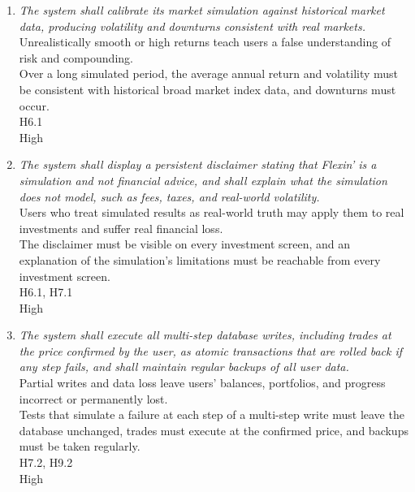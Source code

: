 \documentclass{article}
\begin{document}
\begin{enumerate}[{SR}1:]
\item \hypertarget{sr10}{}\emph{The system shall calibrate its market simulation against historical market data, producing volatility and downturns consistent with real markets.}\\
     Unrealistically smooth or high returns teach users a false understanding of risk and compounding.\\
     Over a long simulated period, the average annual return and volatility must be consistent with historical broad market index data, and downturns must occur.\\
     H6.1\\
     High

\item \hypertarget{sr11}{}\emph{The system shall display a persistent disclaimer stating that Flexin' is a simulation and not financial advice, and shall explain what the simulation does not model, such as fees, taxes, and real-world volatility.}\\
     Users who treat simulated results as real-world truth may apply them to real investments and suffer real financial loss.\\
     The disclaimer must be visible on every investment screen, and an explanation of the simulation's limitations must be reachable from every investment screen.\\
     H6.1, H7.1\\
     High

\item \hypertarget{sr12}{}\emph{The system shall execute all multi-step database writes, including trades at the price confirmed by the user, as atomic transactions that are rolled back if any step fails, and shall maintain regular backups of all user data.}\\
     Partial writes and data loss leave users' balances, portfolios, and progress incorrect or permanently lost.\\
     Tests that simulate a failure at each step of a multi-step write must leave the database unchanged, trades must execute at the confirmed price, and backups must be taken regularly.\\
     H7.2, H9.2\\
     High

\end{enumerate}
\end{document}
